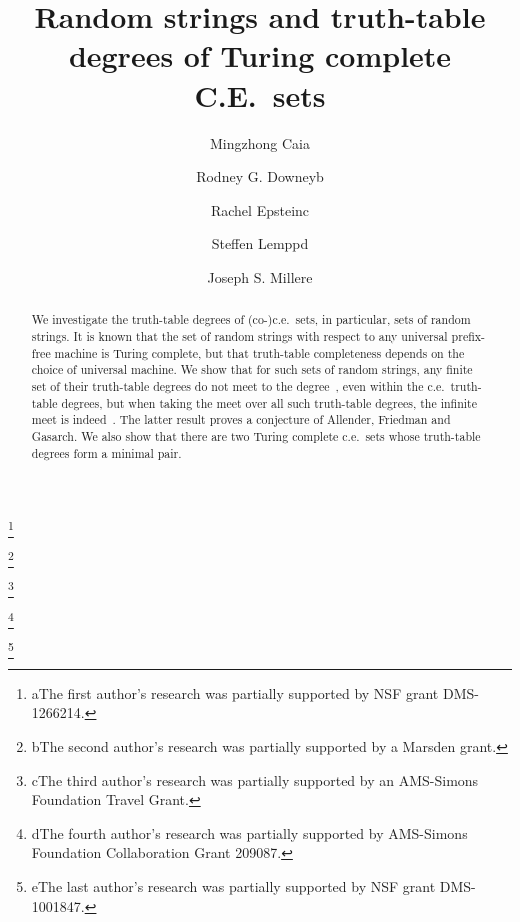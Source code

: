 \documentclass{LMCS}
\newcommand{\0}{\mathbf{0}}
\newcommand{\ce}{c.e.\ }
\newcommand{\<}{\langle}
\renewcommand{\>}{\rangle}
\begin{document}
\title[Random strings and tt-degrees of Turing complete C.E.\ sets]{Random strings and truth-table degrees of Turing complete C.E.\ sets}

\author[M.~Cai]{Mingzhong Cai\rsuper a}
\address{{\lsuper a}Department of Mathematics \\
  Dartmouth College \\
  Hanover, NH 03755, USA}
\thanks{{\lsuper a}The first author's research was partially supported
  by NSF grant DMS-1266214.}



\author[R.~G.~Downey]{Rodney G. Downey\rsuper b}
\address{{\lsuper b}Department of Mathematics, Statistics, and Operations
  Research \\
  Victoria University of Wellington \\
  P.O. Box 600 \\
  Wellington, NEW ZEALAND}
\thanks{{\lsuper b}The second author's research was partially supported by a
  Marsden grant.}



\author[R.~Epstein]{Rachel Epstein\rsuper c}
\address{{\lsuper c}Department of Mathematics and Statistics\\
  Swarthmore College \\
  500 College Ave \\
  Swarthmore, PA 19081, USA}
\thanks{{\lsuper c}The third author's research was partially supported by an
AMS-Simons Foundation Travel Grant.}



\author[S.~Lempp]{Steffen Lempp\rsuper d}
\address{{}Department of Mathematics \\
  University of Wisconsin \\
  Madison, WI 53706-1388, USA}

\thanks{{\lsuper d}The fourth author's research was partially
  supported by AMS-Simons Foundation Collaboration Grant 209087.}

\author[J.~S.~Miller]{Joseph S. Miller\rsuper e}
\thanks{{\lsuper e}The last author's research was partially supported
  by NSF grant DMS-1001847.}


\begin{abstract}
We investigate the truth-table degrees of (co-)c.e.\ sets, in particular,
sets of random strings. It is known that the set of random
strings with respect to any universal prefix-free machine is Turing complete,
but that truth-table completeness depends on the choice of universal machine.
We show that for such sets of
random strings, any finite set of their truth-table degrees do not meet to
the degree~, even within the \ce truth-table degrees, but when
taking the meet over all such truth-table degrees, the infinite meet is
indeed~. The latter result proves a conjecture of Allender,
Friedman and Gasarch. We also show that there are two Turing
complete c.e.\ sets whose truth-table degrees form a minimal pair.
\end{abstract}
\end{document}
